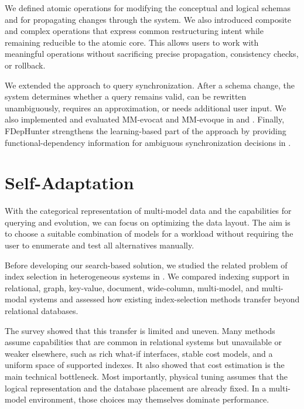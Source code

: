 We defined atomic operations for modifying the conceptual and logical schemas and for propagating changes through the system. We also introduced composite and complex operations that express common restructuring intent while remaining reducible to the atomic core. This allows users to work with meaningful operations without sacrificing precise propagation, consistency checks, or rollback.

We extended the approach to query synchronization. After a schema change, the system determines whether a query remains valid, can be rewritten unambiguously, requires an approximation, or needs additional user input. We also implemented and evaluated MM-evocat and MM-evoque in  and . Finally, FDepHunter strengthens the learning-based part of the approach by providing functional-dependency information for ambiguous synchronization decisions in .


\section{Self-Adaptation}

With the categorical representation of multi-model data and the capabilities for querying and evolution, we can focus on optimizing the data layout. The aim is to choose a suitable combination of models for a workload without requiring the user to enumerate and test all alternatives manually.

Before developing our search-based solution, we studied the related problem of index selection in heterogeneous systems in . We compared indexing support in relational, graph, key-value, document, wide-column, multi-model, and multi-modal systems and assessed how existing index-selection methods transfer beyond relational databases.

The survey showed that this transfer is limited and uneven. Many methods assume capabilities that are common in relational systems but unavailable or weaker elsewhere, such as rich what-if interfaces, stable cost models, and a uniform space of supported indexes. It also showed that cost estimation is the main technical bottleneck. Most importantly, physical tuning assumes that the logical representation and the database placement are already fixed. In a multi-model environment, those choices may themselves dominate performance.

